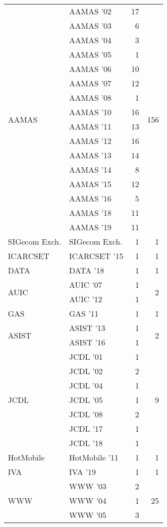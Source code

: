 \begin{table*}[t]
\begin{tabular}{llrr}
\multirow{16}{*}{AAMAS } & AAMAS '02 & 17 & \multirow{16}{*}{156}\\
& AAMAS '03 & 6 &\\
& AAMAS '04 & 3 &\\
& AAMAS '05 & 1 &\\
& AAMAS '06 & 10 &\\
& AAMAS '07 & 12 &\\
& AAMAS '08 & 1 &\\
& AAMAS '10 & 16 &\\
& AAMAS '11 & 13 &\\
& AAMAS '12 & 16 &\\
& AAMAS '13 & 14 &\\
& AAMAS '14 & 8 &\\
& AAMAS '15 & 12 &\\
& AAMAS '16 & 5 &\\
& AAMAS '18 & 11 &\\
& AAMAS '19 & 11 &\\
\multirow{1}{*}{SIGecom Exch.} & SIGecom Exch. & 1 & \multirow{1}{*}{1}\\
\multirow{1}{*}{ICARCSET } & ICARCSET '15 & 1 & \multirow{1}{*}{1}\\
\multirow{1}{*}{DATA } & DATA '18 & 1 & \multirow{1}{*}{1}\\
\multirow{2}{*}{AUIC } & AUIC '07 & 1 & \multirow{2}{*}{2}\\
& AUIC '12 & 1 &\\
\multirow{1}{*}{GAS } & GAS '11 & 1 & \multirow{1}{*}{1}\\
\multirow{2}{*}{ASIST } & ASIST '13 & 1 & \multirow{2}{*}{2}\\
& ASIST '16 & 1 &\\
\multirow{7}{*}{JCDL } & JCDL '01 & 1 & \multirow{7}{*}{9}\\
& JCDL '02 & 2 &\\
& JCDL '04 & 1 &\\
& JCDL '05 & 1 &\\
& JCDL '08 & 2 &\\
& JCDL '17 & 1 &\\
& JCDL '18 & 1 &\\
\multirow{1}{*}{HotMobile } & HotMobile '11 & 1 & \multirow{1}{*}{1}\\
\multirow{1}{*}{IVA } & IVA '19 & 1 & \multirow{1}{*}{1}\\
\multirow{15}{*}{WWW } & WWW '03 & 2 & \multirow{15}{*}{25}\\
& WWW '04 & 1 &\\
& WWW '05 & 3 &\\

\end{tabular}
\end{table*}
